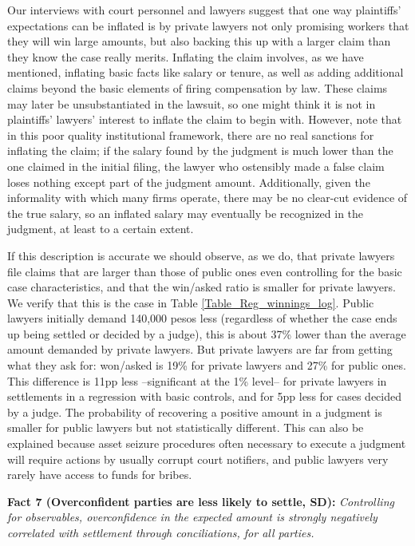 \documentclass[11pt]{article}
\begin{document}
Our interviews with court personnel and lawyers suggest that one way plaintiffs' expectations can be inflated is by private lawyers not only promising workers that they will win large amounts, but also backing this up with a larger claim than they know the case really merits. Inflating the claim involves, as we have mentioned, inflating basic facts like salary or tenure, as well as adding additional claims beyond the basic elements of firing compensation by law. These claims may later be unsubstantiated in the lawsuit, so one might think it is not in plaintiffs' lawyers' interest to inflate the claim to begin with. However, note that in this poor quality institutional framework, there are no real sanctions for inflating the claim; if the salary found by the judgment is much lower than the one claimed in the initial filing, the lawyer who ostensibly made a false claim loses nothing except part of the judgment amount. Additionally, given the informality with which many firms operate, there may be no clear-cut evidence of the true salary, so an inflated salary may eventually be recognized in the judgment, at least to a certain extent. 

If this description is accurate we should observe, as we do, that private lawyers file claims that are larger than those of public ones even controlling for the basic case characteristics, and that the win/asked ratio is smaller for private lawyers. We verify that this is the case in Table \ref{Table_Reg_winnings_log}. Public lawyers initially demand 140,000 pesos less (regardless of whether the case ends up being settled or decided by a judge), this is about 37\% lower than the average amount demanded by private lawyers. But private lawyers are far from getting what they ask for: won/asked is 19\% for private lawyers and 27\% for public ones. This difference is 11pp less --significant at the 1\% level-- for private lawyers in settlements in a regression with basic controls, and for 5pp less for cases decided by a judge. The probability of recovering a positive amount in a judgment is smaller for public lawyers but not statistically different. This can also be explained because asset seizure procedures often necessary to execute a judgment will require actions by usually corrupt court notifiers, and public lawyers very rarely have access to funds for bribes. 


\vspace{.3in}
\begin{singlespace}
\textbf{Fact 7 (Overconfident parties are less likely to settle, SD):} \emph{Controlling for observables, overconfidence in the expected amount is strongly negatively correlated with settlement through conciliations, for all parties.}
\end{singlespace}
\vspace{.1in}
\end{document}

